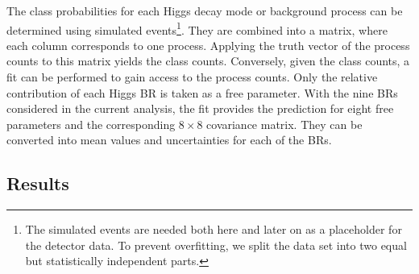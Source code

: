 \documentclass[a4paper,11pt]{article}
\begin{document}
The class probabilities for each Higgs decay mode or background process can
be determined using simulated events\footnote{
    The simulated events are needed both here and later on as a placeholder
    for the detector data.
    To prevent overfitting, we split the data set
    into two equal but statistically independent parts.
}.
They are combined into a matrix, where each column corresponds to one process.
Applying the truth vector of the process counts to this matrix yields the class counts.
Conversely, given the class counts, a fit can be performed to gain access to the
process counts.
Only the relative contribution of each Higgs BR is taken as a free parameter.
With the nine BRs considered in the current analysis,
the fit provides the prediction for eight free parameters
and the corresponding $8 \times 8$ covariance matrix.
They can be converted into mean values and uncertainties for each of the BRs.

\subsection{Results}
\end{document}
